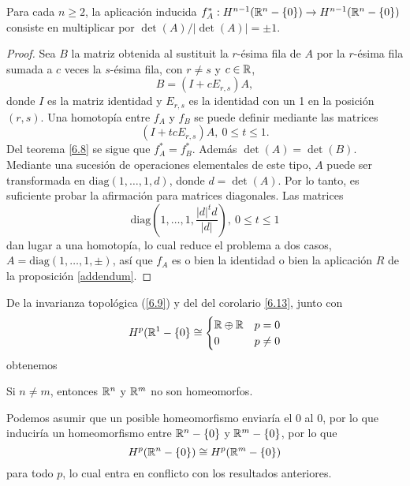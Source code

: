 \documentclass[CV.tex]{subfiles}
\begin{document}
\begin{coro}
Para cada $n\geq 2$, la aplicación inducida $f_A^*:H^{n-1}(\mathbb{R}^n-\{0\})\to H^{n-1}(\mathbb{R}^n-\{0\})$ consiste en multiplicar por $\det(A)/|\det(A)|=\pm 1$.
\end{coro}
\begin{proof}
Sea $B$ la matriz obtenida al sustituit la $r$-ésima fila de $A$ por la $r$-ésima fila sumada a $c$ veces la $s$-ésima fila, con $r\neq s$ y $c\in\mathbb{R}$,
\[
B=(I+cE_{r,s})A,
\]
donde $I$ es la matriz identidad y $E_{r,s}$ es la identidad con un 1 en la posición $(r,s)$. Una homotopía entre $f_A$ y $f_B$ se puede definir mediante las matrices
\[
(I+tcE_{r,s})A,\ 0\leq t\leq 1.
\]
Del teorema \ref{6.8} se sigue que $f_A^*=f_B^*$. Además $\det(A)=\det(B)$. Mediante una sucesión de operaciones elementales de este tipo, $A$ puede ser transformada en $\mathrm{diag}(1,\dots, 1,d)$, donde $d=\det(A)$. Por lo tanto, es suficiente probar la afirmación para matrices diagonales. Las matrices
\[
\mathrm{diag}(1,\dots, 1, \frac{|d|^td}{|d|}),\ 0\leq t\leq 1
\]
dan lugar a una homotopía, lo cual reduce el problema a dos casos, $A=\mathrm{diag}(1,\dots, 1,\pm)$, así que $f_A$ es o bien la identidad o bien la aplicación $R$ de la proposición \ref{addendum}.
\end{proof}

De la invarianza topológica (\ref{6.9}) y del del corolario \ref{6.13}, junto con 
\[
H^p(\mathbb{R}^1-\{0\}\cong\begin{cases}
\mathbb{R}\oplus\mathbb{R} & p=0\\
0 & p\neq 0
\end{cases}
\]
obtenemos

\begin{prop}
Si $n\neq m$, entonces $\mathbb{R}^n$ y $\mathbb{R}^m$ no son homeomorfos. 
\end{prop}
\begin{dem}
Podemos asumir que un posible homeomorfismo enviaría el 0 al 0, por lo que induciría un homeomorfismo entre $\mathbb{R}^n-\{0\}$ y $\mathbb{R}^m-\{0\}$, por lo que
\[
H^p(\mathbb{R}^n-\{0\})\cong H^p(\mathbb{R}^m-\{0\})
\]
para todo $p$, lo cual entra en conflicto con los resultados anteriores.
\QED
\end{dem}
\end{document}

